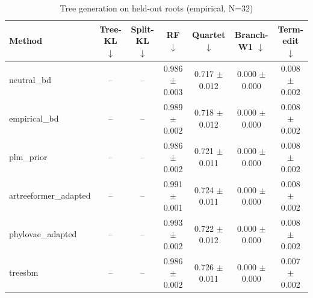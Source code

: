 \begin{table}[t]\centering
\caption{Tree generation on held-out roots (empirical, N=32)}
\begin{tabular}{lcccccc}
\toprule
Method & Tree-KL $\downarrow$ & Split-KL $\downarrow$ & RF $\downarrow$ & Quartet $\downarrow$ & Branch-W1 $\downarrow$ & Term-edit $\downarrow$ \\
\midrule
neutral\_bd & -- & -- & 0.986 $\pm$ 0.003 & 0.717 $\pm$ 0.012 & 0.000 $\pm$ 0.000 & 0.008 $\pm$ 0.002 \\
empirical\_bd & -- & -- & 0.989 $\pm$ 0.002 & 0.718 $\pm$ 0.012 & 0.000 $\pm$ 0.000 & 0.008 $\pm$ 0.002 \\
plm\_prior & -- & -- & 0.986 $\pm$ 0.002 & 0.721 $\pm$ 0.011 & 0.000 $\pm$ 0.000 & 0.008 $\pm$ 0.002 \\
artreeformer\_adapted & -- & -- & 0.991 $\pm$ 0.001 & 0.724 $\pm$ 0.011 & 0.000 $\pm$ 0.000 & 0.008 $\pm$ 0.002 \\
phylovae\_adapted & -- & -- & 0.993 $\pm$ 0.002 & 0.722 $\pm$ 0.012 & 0.000 $\pm$ 0.000 & 0.008 $\pm$ 0.002 \\
treesbm & -- & -- & 0.986 $\pm$ 0.002 & 0.726 $\pm$ 0.011 & 0.000 $\pm$ 0.000 & 0.007 $\pm$ 0.002 \\
\bottomrule
\end{tabular}
\end{table}